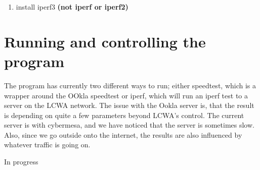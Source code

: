 \documentclass[12pt]{article}
\begin{document}
\begin{enumerate}
\item install iperf3 \textbf{(not iperf or iperf2)}
\end{enumerate}



\section{Running and controlling the program}

The program has currently two different ways to run; either speedtest, which is a wrapper around the OOkla speedtest  or iperf, which will run an iperf test to a server on the LCWA network. The issue with the Ookla server is, that the result is depending on quite a few parameters beyond LCWA's control. The current server is with cybermesa,
and we have noticed that the server is sometimes slow. Also, since we go outside onto the internet, the results are also influenced by whatever traffic is going on.

In progress



\end{document}
